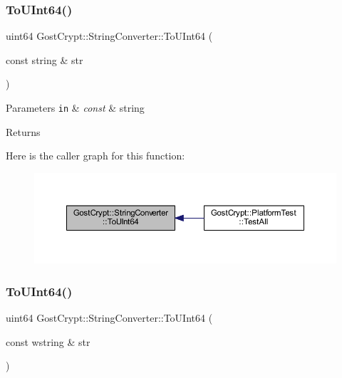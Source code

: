\subsubsection{\texorpdfstring{To\+U\+Int64()}{ToUInt64()}\hspace{0.1cm}{\footnotesize\ttfamily [1/2]}}
{\footnotesize\ttfamily uint64 Gost\+Crypt\+::\+String\+Converter\+::\+To\+U\+Int64 (\begin{DoxyParamCaption}\item[{const string \&}]{str }\end{DoxyParamCaption})\hspace{0.3cm}{\ttfamily [static]}}


\begin{DoxyParams}[1]{Parameters}
\mbox{\tt in}  & {\em const} & string \\
\hline
\end{DoxyParams}
\begin{DoxyReturn}{Returns}

\end{DoxyReturn}
Here is the caller graph for this function\+:
\nopagebreak
\begin{figure}[H]
\begin{center}
\leavevmode
\includegraphics[width=350pt]{class_gost_crypt_1_1_string_converter_ada0fc4768185c72b861c48904da33d56_icgraph}
\end{center}
\end{figure}
\mbox{\label{class_gost_crypt_1_1_string_converter_a8ea2fe72a7ffaca52b4915607e64f307}} 
\subsubsection{\texorpdfstring{To\+U\+Int64()}{ToUInt64()}\hspace{0.1cm}{\footnotesize\ttfamily [2/2]}}
{\footnotesize\ttfamily uint64 Gost\+Crypt\+::\+String\+Converter\+::\+To\+U\+Int64 (\begin{DoxyParamCaption}\item[{const wstring \&}]{str }\end{DoxyParamCaption})\hspace{0.3cm}{\ttfamily [static]}}


